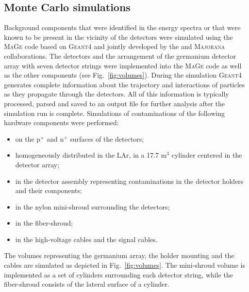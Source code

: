 \subsection*{Monte Carlo simulations}
Background components that were identified in the energy spectra or that were known to be present in the vicinity of the detectors were simulated using the \textsc{MaGe} \cite{MaGe} code based on \textsc{Geant4} \cite{geant4} and jointly developed by the {\gerda} and \textsc{Majorana} \cite{majoranadem} collaborations. The detectors and the arrangement of the germanium detector array with seven detector strings were implemented into the \textsc{MaGe} code as well as the other {\gerda} components (see Fig.~\ref{fig:volumes}). During the simulation \textsc{Geant4} generates complete information about the trajectory and interactions of particles as they propagate through the detectors. All of this information is typically processed, parsed and saved to an output file for further analysis after the simulation run is complete. Simulations of contaminations of the following hardware components were performed:
\begin{itemize}
	\item on the p$^+$ and n$^+$ surfaces of the detectors;
	\item homogeneously distributed in the LAr, in a 17.7 m$^3$ cylinder centered in the detector array;
	\item in the detector assembly representing contaminations in the detector holders and their components;
	\item in the nylon mini-shroud surrounding the detectors;
	\item in the fiber-shroud;
	\item in the high-voltage cables and the signal cables.
\end{itemize}
The volumes representing the germanium array, the holder mounting and the cables are simulated as depicted in Fig.~\ref{fig:volumes}. The mini-shroud volume is implemented as a set of cylinders surrounding each detector string, while the fiber-shroud consists of the lateral surface of a cylinder.
